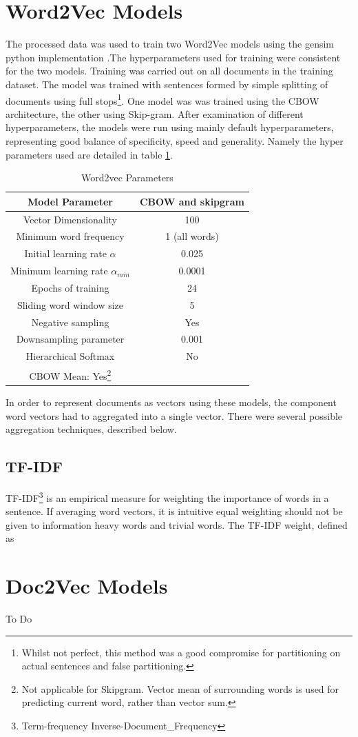 \section{Word2Vec Models}
The processed data was used to train two Word2Vec models using the gensim python implementation \cite{gensim}.The hyperparameters used for training were consistent for the two models.
Training was carried out on all documents in the training dataset. The model was trained with sentences formed by simple splitting of documents using full stops\footnote{Whilst not perfect, this method was a good compromise for partitioning on actual sentences and false partitioning.}. One model was was trained using the CBOW architecture, the other using Skip-gram. After examination of different hyperparameters, the models were run using mainly default hyperparameters, representing good balance of specificity, speed and generality\cite{gensim}. Namely the hyper parameters used are detailed in table \ref{tab:hyperparams}.
\begin{table}[h!]
\begin{center}
\label{tab:hyperparams}
\caption{Word2vec Parameters}
\begin{tabular}{||c|c||}
\hline
Model Parameter &CBOW and skipgram\\
\hline
Vector Dimensionality & 100\\
Minimum word frequency & 1 (all words)\\
Initial learning rate $\alpha$ & 0.025 \\
Minimum learning rate $\alpha_{min}$&0.0001\\
Epochs of training & 24\\
Sliding word window size & 5\\
Negative sampling & Yes \\
Downsampling parameter & 0.001\\
Hierarchical Softmax & No\\
CBOW Mean: Yes\footnote{Not applicable for Skipgram. Vector mean of surrounding words is used for predicting current word, rather than vector sum.}
\hline
\end{tabular}
\end{center}
\end{table}
In order to represent documents as vectors using these models, the component word vectors had to aggregated into a single vector. There were several possible aggregation techniques, described below.
\subsection{TF-IDF}
TF-IDF\footnote{Term-frequency Inverse-Document_Frequency} is an empirical measure for weighting the importance of words in a sentence. If averaging word vectors, it is intuitive equal weighting should not be given to information heavy words and trivial words. The TF-IDF weight, defined as 
$$ $$
\section{Doc2Vec Models}
To Do